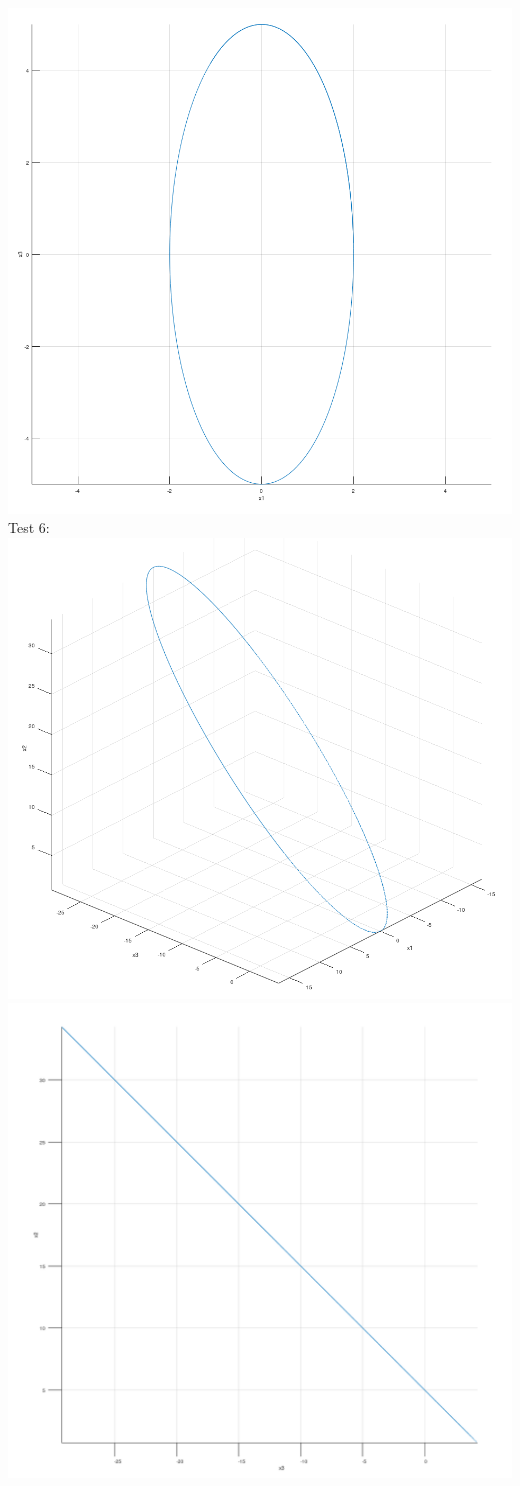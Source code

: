 \documentclass[12pt, letterpaper, twoside]{article}    %
\begin{document}
\includegraphics[width=\textwidth]{test52}
\newpage
Test 6: \\
\includegraphics[width=\textwidth]{test61}
\includegraphics[width=\textwidth]{test62}
\newpage
\end{document}
